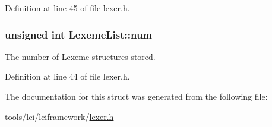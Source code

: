 Definition at line 45 of file lexer.\-h.

\hypertarget{struct_lexeme_list_ab9e4971353dc5b435d604d3dbaef1857}{
\subsubsection[{num}]{\setlength{\rightskip}{0pt plus 5cm}unsigned int {\bf Lexeme\-List\-::num}}}\label{struct_lexeme_list_ab9e4971353dc5b435d604d3dbaef1857}
The number of \hyperlink{struct_lexeme}{Lexeme} structures stored. 

Definition at line 44 of file lexer.\-h.



The documentation for this struct was generated from the following file\-:\begin{DoxyCompactItemize}
\item 
tools/lci/lciframework/\hyperlink{lexer_8h}{lexer.\-h}\end{DoxyCompactItemize}
